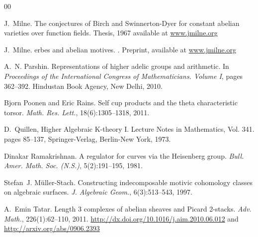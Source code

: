 \documentclass{amsart}
\numberwithin{equation}{subsection}
\theoremstyle{remark}
\theoremstyle{remark}
\begin{document}
\begin{thebibliography}{00}


 J.~Milne.
\newblock The conjectures of {B}irch and {S}winnerton-{D}yer for constant abelian varieties over function fields.
\newblock Thesis, 1967
\newblock  available at \href{http://jmilne.org/math/articles/1967.pdf}{www.jmilne.org}

 J.~Milne.
erbes and abelian motives.
.
\newblock Preprint, available at  \href{http://jmilne.org/math/articles/2003b.pdf}{www.jmilne.org}


 A.~N. Parshin.
\newblock Representations of higher adelic groups and arithmetic.
\newblock In \emph{Proceedings of the {I}nternational {C}ongress of
  {M}athematicians. {V}olume {I}}, pages 362--392. Hindustan Book Agency, New
  Delhi, 2010.


 Bjorn Poonen and Eric Rains.
\newblock Self cup products and the theta characteristic torsor.
\newblock \emph{Math. Res. Lett.}, 18(6):1305--1318, 2011.

 D.~Quillen,
\newblock Higher Algebraic {K}-theory {I}.
 \newblock Lecture Notes in Mathematics, Vol. 341. 
 \newblock pages 85--137,
 \newblock Springer-Verlag, Berlin-New
  York, 1973.
  
  Dinakar Ramakrishnan.
\newblock A regulator for curves via the {H}eisenberg group.
\newblock \emph{Bull. Amer. Math. Soc. (N.S.)}, 5(2):191--195, 1981.



Stefan~J. M{\"u}ller-Stach.
\newblock Constructing indecomposable motivic cohomology classes on algebraic
  surfaces.
\newblock \emph{J. Algebraic Geom.}, 6(3):513--543, 1997.


  A.~Emin Tatar.
\newblock Length 3 complexes of abelian sheaves and {P}icard 2-stacks.
\newblock \emph{Adv. Math.}, 226(1):62--110, 2011.
 \newblock  \url{http://dx.doi.org/10.1016/j.aim.2010.06.012} and
 \newblock \url{http://arxiv.org/abs/0906.2393}


\end{thebibliography}
\end{document}
